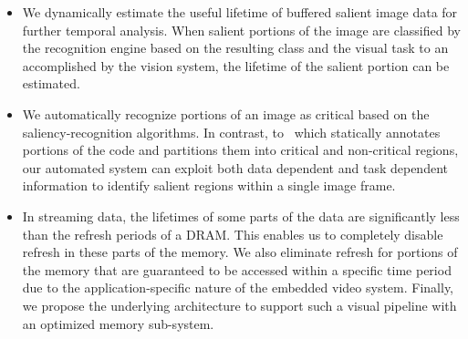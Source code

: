 \begin{itemize}[leftmargin=*]
\item We dynamically estimate the useful lifetime of buffered salient image data for further temporal analysis. When salient portions of the image are classified by the recognition engine based on the resulting class and the visual task to an accomplished by the vision system, the lifetime of the salient portion can be estimated. 
\item We automatically recognize portions of an image as critical based on the saliency-recognition algorithms.
In contrast, to~\cite{Liu2011} which statically annotates portions of the code and partitions them into critical and non-critical regions, our automated system can exploit both data dependent and task dependent information to identify salient regions within a single image frame. 
\item In streaming data, the lifetimes of some parts of the data are significantly less than the refresh periods of a DRAM. This enables us to completely disable refresh in these parts of the memory. 
We also eliminate refresh for portions of the memory that are guaranteed to be accessed within a specific time period due to the application-specific nature of the embedded video system.
Finally, we propose the underlying architecture to support such a visual pipeline with an optimized memory sub-system.
\end{itemize}


